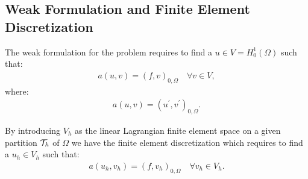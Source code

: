 \subsection{Weak Formulation and Finite Element Discretization} \label{fem_definition}

The weak formulation for the problem requires to find a $u \in V = H_0^1(\Omega)$ such that:
\begin{gather}
	a(u, v) = (f, v)_{0, \Omega} \quad \forall v \in V,
\end{gather}
where:
\begin{gather}
	a(u, v) = (u^{\prime}, v^{\prime})_{0, \Omega}.
\end{gather}

By introducing $V_h$ as the linear Lagrangian finite element space on a given partition $\mathcal{T}_h$ of $\Omega$ we have the finite element discretization which requires to find a $u_h \in V_h$ such that:
\begin{gather}
	a(u_h, v_h) = (f, v_h)_{0, \Omega} \quad \forall v_h \in V_h.
\end{gather}